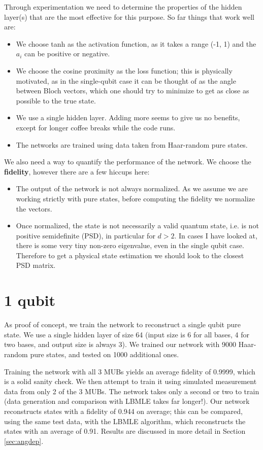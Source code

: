 \documentclass[a4paper,10pt]{article}
\begin{document}
Through experimentation we need to determine the properties of the hidden layer(s) that are the most effective for this purpose. So far things that work well are:
\begin{itemize}
\item {We choose tanh as the activation function, as it takes a range (-1, 1) and the $a_i$ can be positive or negative.}
\item {We choose the cosine proximity as the loss function; this is physically motivated, as in the single-qubit case it can be thought of as the angle between Bloch vectors, which one should try to minimize to get as close as possible to the true state.}
\item {We use a single hidden layer. Adding more seems to give us no benefits, except for longer coffee breaks while the code runs.}
\item {The networks are trained using data taken from Haar-random pure states.}
\end{itemize}

\noindent We also need a way to quantify the performance of the network. We choose the \textbf{fidelity}, however there are a few hiccups here:
\begin{itemize}
 \item{The output of the network is not always normalized. As we assume we are working strictly with pure states, before computing the fidelity we normalize the vectors.}
 \item{Once normalized, the state is not necessarily a valid quantum state, i.e. is not positive semidefinite (PSD), in particular for $d > 2$. In cases I have looked at, there is some very tiny non-zero eigenvalue, even in the single qubit case. Therefore to get a physical state estimation we should look to the closest PSD matrix.}
\end{itemize}


\section{1 qubit}

As proof of concept, we train the network to reconstruct a single qubit pure state. We use a single hidden layer of size 64 (input size is 6 for all bases, 4 for two bases, and output size is always 3). We trained our network with 9000 Haar-random pure states, and tested on 1000 additional ones.

Training the network with all 3 MUBs yields an average fidelity of 0.9999, which is a solid sanity check. We then attempt to train it using simulated measurement data from only 2 of the 3 MUBs. The network takes only a second or two to train (data generation and comparison with LBMLE takes far longer!). Our network reconstructs states with a fidelity of 0.944 on average; this can be compared, using the same test data, with the LBMLE algorithm, which reconstructs the states with an average of 0.91. Results are discussed in more detail in Section \ref{sec:angdep}.
\end{document}
